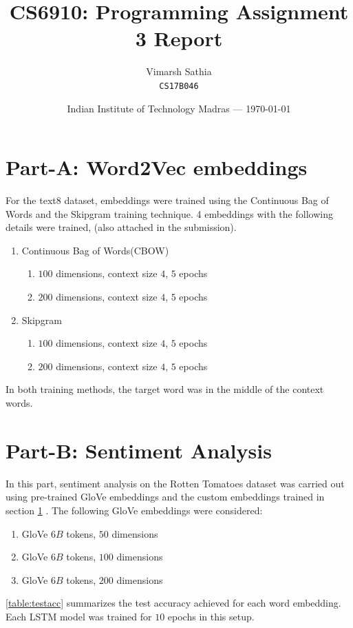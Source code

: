 \documentclass{article}
\title{CS6910: Programming Assignment 3 Report} %
\author{Vimarsh Sathia\\ \texttt{CS17B046}} %
\date{Indian Institute of Technology Madras --- \today} %
\begin{document}
\maketitle %

\section{Part-A: Word2Vec embeddings} \label{parta}
For the text8 dataset, embeddings were trained using the Continuous Bag of Words and the Skipgram training technique. 4 embeddings with the following details were trained, (also attached in the submission).
\begin{enumerate}
    \item Continuous Bag of Words(CBOW)
        \begin{enumerate}
            \item $100$ dimensions, context size $4$, $5$ epochs
            \item $200$ dimensions, context size $4$, $5$ epochs
        \end{enumerate}
    \item Skipgram
    \begin{enumerate}
        \item $100$ dimensions, context size $4$, $5$ epochs
        \item $200$ dimensions, context size $4$, $5$ epochs
    \end{enumerate}
\end{enumerate}
In both training methods, the target word was in the middle of the context words.
\section{Part-B: Sentiment Analysis}
In this part, sentiment analysis on the Rotten Tomatoes dataset was carried out using pre-trained GloVe embeddings and the custom embeddings trained in section \cref{parta} . The following GloVe embeddings were considered:
\begin{enumerate}
    \item GloVe $6B$ tokens, $50$ dimensions
    \item GloVe $6B$ tokens, $100$ dimensions
    \item GloVe $6B$ tokens, $200$ dimensions
\end{enumerate}
\cref{table:testacc} summarizes the test accuracy achieved for each word embedding. Each LSTM model was trained for $10$ epochs in this setup.
\end{document}
